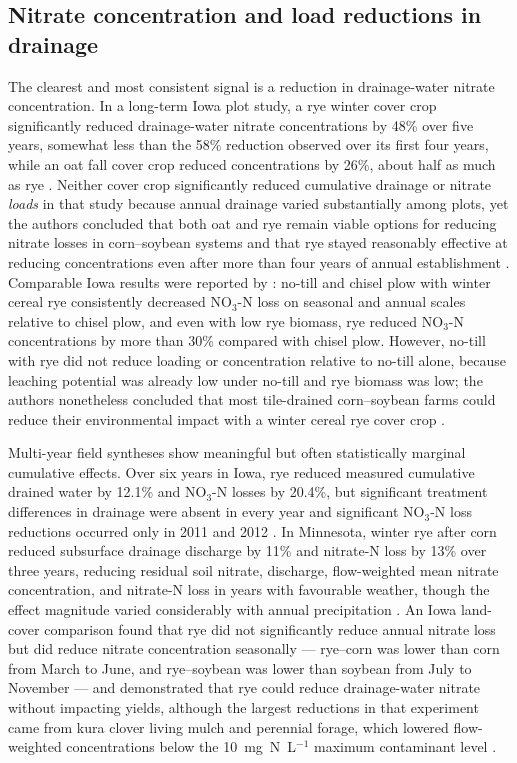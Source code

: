 \documentclass[11pt]{article}
\begin{document}
\subsection{Nitrate concentration and load reductions in drainage}
The clearest and most consistent signal is a reduction in drainage-water nitrate concentration. In a long-term Iowa plot study, a rye winter cover crop significantly reduced drainage-water nitrate concentrations by 48\% over five years, somewhat less than the 58\% reduction observed over its first four years, while an oat fall cover crop reduced concentrations by 26\%, about half as much as rye \parencite{Kaspar2012}. Neither cover crop significantly reduced cumulative drainage or nitrate \emph{loads} in that study because annual drainage varied substantially among plots, yet the authors concluded that both oat and rye remain viable options for reducing nitrate losses in corn--soybean systems and that rye stayed reasonably effective at reducing concentrations even after more than four years of annual establishment \parencite{Kaspar2012}. Comparable Iowa results were reported by \textcite{Waring2020}: no-till and chisel plow with winter cereal rye consistently decreased NO$_3$-N loss on seasonal and annual scales relative to chisel plow, and even with low rye biomass, rye reduced NO$_3$-N concentrations by more than 30\% compared with chisel plow. However, no-till with rye did not reduce loading or concentration relative to no-till alone, because leaching potential was already low under no-till and rye biomass was low; the authors nonetheless concluded that most tile-drained corn--soybean farms could reduce their environmental impact with a winter cereal rye cover crop \parencite{Waring2020}.

Multi-year field syntheses show meaningful but often statistically marginal cumulative effects. Over six years in Iowa, rye reduced measured cumulative drained water by 12.1\% and NO$_3$-N losses by 20.4\%, but significant treatment differences in drainage were absent in every year and significant NO$_3$-N loss reductions occurred only in 2011 and 2012 \parencite{MartinezFeria2016}. In Minnesota, winter rye after corn reduced subsurface drainage discharge by 11\% and nitrate-N loss by 13\% over three years, reducing residual soil nitrate, discharge, flow-weighted mean nitrate concentration, and nitrate-N loss in years with favourable weather, though the effect magnitude varied considerably with annual precipitation \parencite{Strock2004}. An Iowa land-cover comparison found that rye did not significantly reduce annual nitrate loss but did reduce nitrate concentration seasonally --- rye--corn was lower than corn from March to June, and rye--soybean was lower than soybean from July to November --- and demonstrated that rye could reduce drainage-water nitrate without impacting yields, although the largest reductions in that experiment came from kura clover living mulch and perennial forage, which lowered flow-weighted concentrations below the 10~mg~N~L$^{-1}$ maximum contaminant level \parencite{Qi2011b}.
\end{document}
